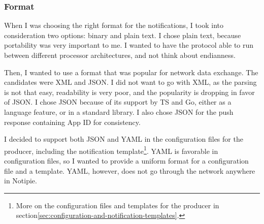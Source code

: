 \subsubsection{Format}\label{sec:protocol-format}

When I was choosing the right format
for the notifications,
I took into consideration two options:
binary and plain text.
I chose plain text,
because portability was very important to me.
I wanted to have the protocol able to run
between different processor architectures,
and not think about endianness.

Then, I wanted to use a format
that was popular for network data exchange.
The candidates were \ac{XML} and \ac{JSON}.
I did not want to go with \ac{XML},
as the parsing is not that easy,
readability is very poor,
and the popularity is dropping
in favor of \ac{JSON}.
I chose \ac{JSON}
because of its support by \ac{TS} and Go,
either as a language feature,
or in a standard library.
I also chose \ac{JSON} for the push response
containing App \ac{ID}
for consistency.

I decided to support both \ac{JSON} and \ac{YAML}
in the configuration files for the producer,
including the notification template\footnote{
  More on the configuration files and templates
  for the producer
  in section\ref{sec:configuration-and-notification-templates}.
}.
\ac{YAML} is favorable in configuration files,
so I wanted to provide a uniform
format for a configuration file
and a template.
\ac{YAML}, however,
does not go through the network
anywhere in Notipie.
